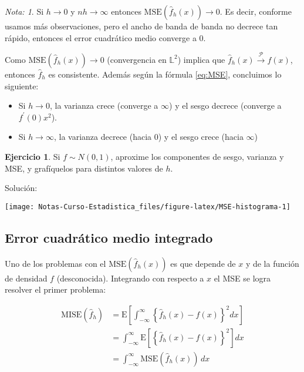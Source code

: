 \documentclass[
  12pt,
]{book}
\providecommand{\tightlist}{%
  \setlength{\itemsep}{0pt}\setlength{\parskip}{0pt}}
\theoremstyle{definition}
\theoremstyle{definition}
\theoremstyle{definition}
\newtheorem{exercise}{Ejercicio}[chapter]
\theoremstyle{definition}
\theoremstyle{remark}
\newtheorem*{remark}{Nota: }
\begin{document}
\begin{remark}

Si \(h \to 0\) y \(nh \to \infty\) entonces \(\mathrm{MSE}\left( \hat{f}_h(x)\right) \to 0\). Es decir, conforme usamos más observaciones, pero el ancho de banda de banda no decrece tan rápido, entonces el error cuadrático medio converge a 0.

Como \(\mathrm{MSE}\left( \hat{f}_h(x)\right) \to 0\) (convergencia en \(\mathbb{L}^2\)) implica que \(\hat{f}_h(x) \stackrel{\mathcal{P}}{\to} f(x)\), entonces \(\hat{f}_h\) es consistente. Además según la fórmula \eqref{eq:MSE}, concluimos lo siguiente:

\begin{itemize}
\tightlist
\item
  Si \(h\to 0\), la varianza crece (converge a \(\infty\)) y el sesgo
  decrece (converge a \(f^\prime (0)x^2\)).
\item
  Si \(h\to \infty\), la varianza decrece (hacia 0) y el sesgo crece
  (hacia \(\infty\))
\end{itemize}

\end{remark}

\begin{exercise}
\protect\hypertarget{exr:unnamed-chunk-7}{}\label{exr:unnamed-chunk-7}Si \(f\sim N(0,1)\), aproxime los componentes de sesgo, varianza y MSE, y grafíquelos para distintos valores de \(h\).
\end{exercise}

Solución:

\begin{center}\texttt{[image: Notas-Curso-Estadistica\_files/figure-latex/MSE-histograma-1]} \end{center}

\hypertarget{error-cuadruxe1tico-medio-integrado}{%
\subsection{Error cuadrático medio integrado}\label{error-cuadruxe1tico-medio-integrado}}

Uno de los problemas con el \(\mathrm{MSE}\left( \hat{f}_h(x)\right)\) es que depende de \(x\) y de la función de densidad \(f\) (desconocida). Integrando con respecto a \(x\) el MSE se logra resolver el primer problema:

\begin{align*}
\mathrm{MISE}\left(  \hat{f}_h\right)
& = \mathrm{E}\left[
\int_{ -\infty}^{\infty} \left\{
\hat{f}_h(x) - f(x)
\right\}^2 dx
\right]                                                       \\
& = \int_{ -\infty}^{\infty} \mathrm{E}\left[
\left\{
\hat{f}_h(x) - f(x)
\right\}^2
\right] dx                                                    \\
& = \int_{ -\infty}^{\infty}\mathrm{MSE}(\hat{f}_h(x)) \, dx
\end{align*}
\end{document}
